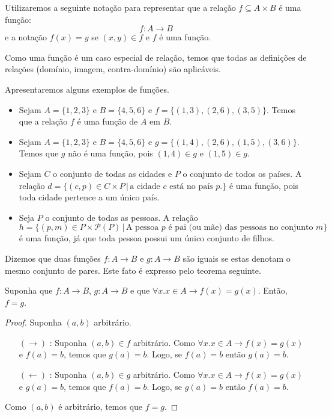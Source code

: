 \begin{Notation}
Utilizaremos a seguinte notação para representar que a relação $f
\subseteq A \times B$ é uma função:
\[
f : A \to B
\]
e a notação $f(x) = y$ se $(x,y) \in f$ e $f$ é uma função.
\end{Notation}
Como uma função é um caso especial de relação, temos que todas as
definições de relações (domínio, imagem, contra-domínio) são aplicáveis.
\begin{Example}
Apresentaremos alguns exemplos de funções.
\begin{itemize}
  \item Sejam $A = \{1,2,3\}$ e $B =\{4,5,6\}$ e $f =
    \{(1,3),(2,6),(3,5)\}$. Temos que a relação $f$ é uma função de
    $A$ em $B$.
  \item Sejam $A = \{1,2,3\}$ e $B =\{4,5,6\}$ e $g =
    \{(1,4),(2,6),(1,5),(3,6)\}$. Temos que $g$ não é uma função, pois
     $(1,4) \in g$ e $(1,5) \in g$.
  \item Sejam $C$ o conjunto de todas as cidades e $P$ o conjunto de
    todos os países. A relação $d =\{(c,p)\in C \times P\,|\,\text{a
      cidade $c$ está no país $p$.}\}$ é uma função, pois toda cidade
    pertence a um único país.
  \item Seja $P$ o conjunto de todas as pessoas. A relação $h =
    \{(p,m)\in P \times \mathcal{P}(P)\,|\,\text{A pessoa $p$  é pai
      (ou mãe) das pessoas no conjunto $m$}\}$ é uma função, já que
    toda pessoa possui um único conjunto de filhos.
\end{itemize}
\end{Example}
Dizemos que duas funções $f : A \to B$ e $g : A \to B$ são iguais se
estas denotam o mesmo conjunto de pares. Este fato é expresso pelo
teorema seguinte.
\begin{Theorem}[Extensionalidade]
Suponha que $f : A \to B$, $g : A \to B$ e que $\forall x. x\in A \to
f(x) = g(x)$. Então, $f = g$.
\end{Theorem}
\begin{proof}
Suponha $(a,b)$ arbitrário.
\begin{enumerate}
  \item[$(\to)$]: Suponha $(a,b) \in f$ arbitrário.
                     Como $\forall x. x\in A \to f(x) = g(x)$ e $f(a)
                     = b$, temos que $g(a) = b$. Logo, se $f(a) = b$
                     então $g(a) = b$.
   \item[$(\leftarrow)$]: Suponha $(a,b) \in g$ arbitrário.
                     Como $\forall x. x\in A \to f(x) = g(x)$ e $g(a)
                     = b$, temos que $f(a) = b$. Logo, se $g(a) = b$
                     então $f(a) = b$.
\end{enumerate}
Como $(a,b)$ é arbitrário, temos que $f = g$.
\end{proof}

